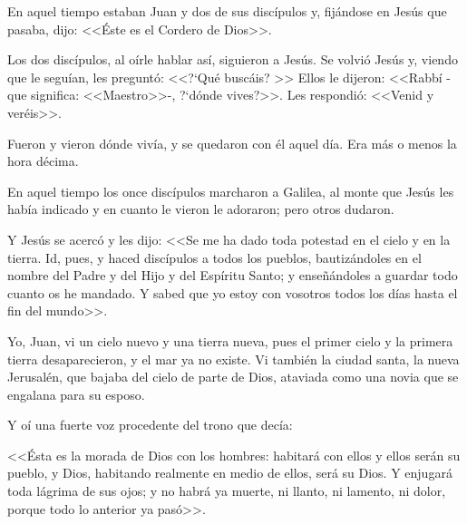 


 En aquel tiempo estaban Juan y dos de sus 
discípulos y, fijándose en Jesús que pasaba, 
dijo: <<Éste es el Cordero de Dios>>. 

 Los dos 
discípulos, al oírle hablar así, siguieron a Jesús. 
Se volvió Jesús y, viendo que le seguían, les 
preguntó: <<?`Qué buscáis? >> Ellos le dijeron: 
<<Rabbí -que significa: <<Maestro>>-, ?`dónde 
vives?>>. Les respondió: <<Venid y veréis>>.  


Fueron y vieron dónde vivía, y se quedaron 
con él aquel día. Era más o menos la hora 
décima. 





 En aquel tiempo los once discípulos 
marcharon a Galilea, al monte que Jesús les 
había indicado y en cuanto le vieron le 
adoraron; pero otros dudaron.  

Y Jesús se 
acercó y les dijo: <<Se me ha dado toda 
potestad en el cielo y en la tierra. Id, pues, y 
haced discípulos a todos los pueblos, 
bautizándoles en el nombre del Padre y del 
Hijo y del Espíritu Santo; y enseñándoles a 
guardar todo cuanto os he mandado. Y sabed 
que yo estoy con vosotros todos los días hasta 
el fin del mundo>>. 






 Yo, Juan, vi un cielo nuevo y una tierra nueva, 
pues el primer cielo y la primera tierra 
desaparecieron, y el mar ya no existe. Vi 
también la ciudad santa, la nueva Jerusalén, 
que bajaba del cielo de parte de Dios, ataviada 
como una novia que se engalana para su 
esposo. 

 Y oí una fuerte voz procedente del 
trono que decía: 

 <<Ésta es la morada de Dios 
con los hombres: habitará con ellos y ellos 
serán su pueblo, y Dios, habitando realmente 
en medio de ellos, será su Dios. Y enjugará 
toda lágrima de sus ojos; y no habrá ya 
muerte, ni llanto, ni lamento, ni dolor, porque 
todo lo anterior ya pasó>>. 




